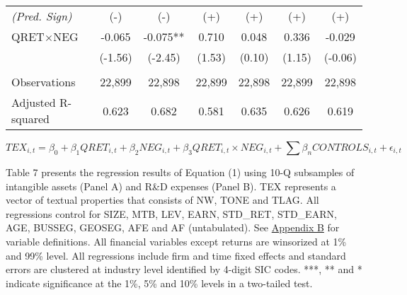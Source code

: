 \begin{table}[H]
\begin{center}
\begin{tabular}{lcccccc}
  		\rowcolor[rgb]{ .933,  .925,  .882} \textit{(Pred. Sign)} & (-) & (-) & (+) & (+) & (+) & (+) \\
  		\rowcolor[rgb]{ .933,  .925,  .882} QRET$\times$NEG & -0.065 & -0.075** & 0.710 & 0.048 & 0.336 & -0.029 \\
  		\rowcolor[rgb]{ .933,  .925,  .882}  & (-1.56) & (-2.45) & (1.53) & (0.10) & (1.15) & (-0.06) \\
  		&   &   &   &   &   &  \\
  		Observations & 22,899 & 22,898 & 22,899 & 22,898 & 22,899 & 22,898 \\
  		Adjusted R-squared & 0.623 & 0.682 & 0.581 & 0.635 & 0.626 & 0.619 \\
  		
  		\bottomrule
  		\bottomrule
  	\end{tabular}%
  \end{center}
\begin{footnotesize}
	\setcounter{equation}{0}
	\begin{equation}
		TEX_{i,t}=\beta_0+\beta_1QRET_{i,t}+\beta_2NEG_{i,t}+\beta_3QRET_{i,t}\times NEG_{i,t}+\sum\beta_nCONTROLS_{i,t}+\epsilon_{i,t}
	\end{equation}
	
	\noindent Table 7 presents the regression results of Equation (1) using 10-Q subsamples of intangible assets (Panel A) and R\&D expenses (Panel B). TEX represents a vector of textual properties that consists of NW, TONE and TLAG. All regressions control for SIZE, MTB, LEV, EARN, STD\_RET, STD\_EARN, AGE, BUSSEG, GEOSEG, AFE and AF (untabulated). See \hyperref[appb]{Appendix B} for variable definitions. All financial variables except returns are winsorized at 1\% and 99\% level. All regressions include firm and time fixed effects and standard errors are clustered at industry level identified by 4-digit SIC codes. ***, ** and * indicate significance at the 1\%, 5\% and 10\% levels in a two-tailed test.
\end{footnotesize}
\end{table}%
